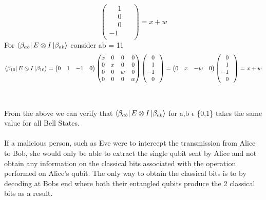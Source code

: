 \documentclass[a4paper,12pt]{article}
\begin{document}
\begin{enumerate}[label=(\alph*)]
\[\begin{pmatrix}
        \phantom{-}1\phantom{-} \\
        \phantom{-}0\phantom{-} \\
        \phantom{-}0\phantom{-} \\
        -1\phantom{-} \\
    \end{pmatrix} = x + w\]
    For $\bra{\beta_{ab}}E \otimes I \ket{\beta_{ab}}$ consider ab = 11
    \[\bra{\beta_{10}}E \otimes I \ket{\beta_{10}} = \begin{pmatrix}
        0 & 1 & -1 & 0
    \end{pmatrix} \begin{pmatrix}
        x & 0 & 0 & 0 \\
        0 & x & 0 & 0 \\
        0 & 0 & w & 0 \\
        0 & 0 & 0 & w \\
    \end{pmatrix} \begin{pmatrix}
        \phantom{-}0\phantom{-} \\
        \phantom{-}1\phantom{-} \\
        -1\phantom{-} \\
        \phantom{-}0\phantom{-} \\
    \end{pmatrix} = \begin{pmatrix}
        0 & x & -w & 0
    \end{pmatrix} \begin{pmatrix}
        \phantom{-}0\phantom{-} \\
        \phantom{-}1\phantom{-} \\
        -1\phantom{-} \\
        \phantom{-}0\phantom{-} \\
    \end{pmatrix} = x + w\] \\~\\
    From the above we can verify that $\bra{\beta_{ab}}E \otimes I \ket{\beta_{ab}}$ for a,b $\epsilon $ \{0,1\} takes the same value for all Bell States.\\~\\
    If a malicious person, such as Eve were to intercept the transmission from Alice to Bob, she would only be able to extract the single qubit sent by Alice and not obtain any information on the classical bits associated with the operation performed on Alice's qubit. The only way to obtain the classical bits is to by decoding at Bobs end where both their entangled qubits produce the 2 classical bits as a result. 
    

\end{enumerate}
\end{document}
